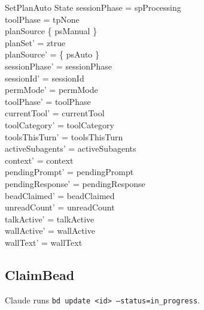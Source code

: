 \documentclass[a4paper,10pt,fleqn]{article}
\begin{document}
\begin{schema}{SetPlanAuto}
  \Delta State
  \where
  sessionPhase = spProcessing \\
  toolPhase = tpNone \\
  planSource \neq \{ psManual \} \\
  planSet' = ztrue \\
  planSource' = \{ psAuto \} \\
  sessionPhase' = sessionPhase \\
  sessionId' = sessionId \\
  permMode' = permMode \\
  toolPhase' = toolPhase \\
  currentTool' = currentTool \\
  toolCategory' = toolCategory \\
  toolsThisTurn' = toolsThisTurn \\
  activeSubagents' = activeSubagents \\
  context' = context \\
  pendingPrompt' = pendingPrompt \\
  pendingResponse' = pendingResponse \\
  beadClaimed' = beadClaimed \\
  unreadCount' = unreadCount \\
  talkActive' = talkActive \\
  wallActive' = wallActive \\
  wallText' = wallText
\end{schema}

\subsection{ClaimBead}

Claude runs \texttt{bd update <id> --status=in\_progress}.
\end{document}
